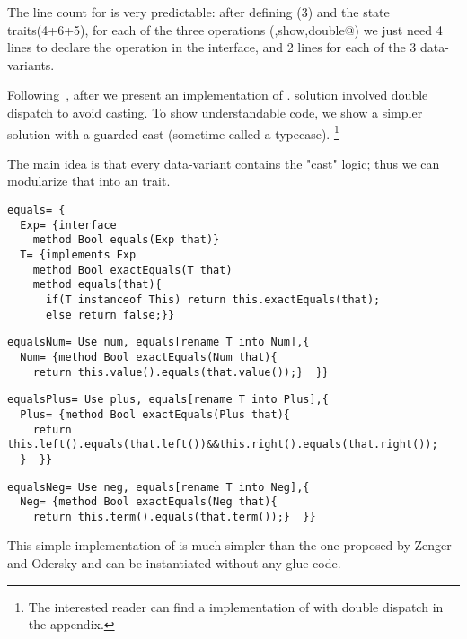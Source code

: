 The line count for \name is very predictable: after defining \Q@exp@ (3) and the state traits(4+6+5),
for each of the three operations (\Q@eval,show,double@) 
we just need 4 lines to declare the operation 
in the interface, and 2 lines for each of the 3 data-variants.

Following~\cite{Zenger-Odersky2005}, after \Q@double@ we present an implementation of \Q@equals@.
\cite{Zenger-Odersky2005} solution involved double dispatch to avoid casting.
To show understandable code, we show a simpler solution 
with a guarded cast (sometime called a typecase).%
\footnote{
The interested reader can find a \name implementation of \Q@equals@ with double dispatch
in the appendix.
}

The main idea is that  every data-variant  contains
 the "cast" logic; thus
 we can modularize that into an \Q@equals@ trait.
\begin{lstlisting}
equals= {
  Exp= {interface
    method Bool equals(Exp that)}
  T= {implements Exp
    method Bool exactEquals(T that)
    method equals(that){
      if(T instanceof This) return this.exactEquals(that);
      else return false;}}
\end{lstlisting}
\multiCode
\begin{lstlisting}
equalsNum= Use num, equals[rename T into Num],{
  Num= {method Bool exactEquals(Num that){
    return this.value().equals(that.value());}  }}
\end{lstlisting}
\multiCode
\begin{lstlisting}
equalsPlus= Use plus, equals[rename T into Plus],{
  Plus= {method Bool exactEquals(Plus that){
    return this.left().equals(that.left())&&this.right().equals(that.right());
  }  }}
\end{lstlisting}
\multiCode
\begin{lstlisting}
equalsNeg= Use neg, equals[rename T into Neg],{
  Neg= {method Bool exactEquals(Neg that){
    return this.term().equals(that.term());}  }}
\end{lstlisting}

This simple implementation of \Q@equals@
is much simpler than the one proposed by Zenger and Odersky
 and can be instantiated without any glue code.

